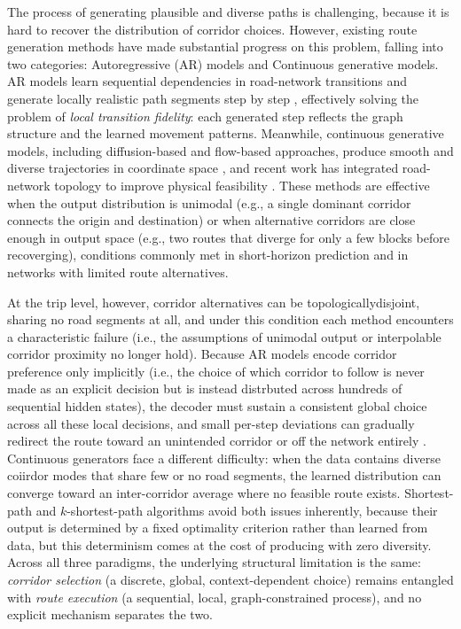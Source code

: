The process of generating plausible and diverse paths is challenging, because it is hard to recover the distribution of corridor choices. 
However, existing route generation methods have made substantial progress on this problem, falling into two categories: Autoregressive (AR) models and Continuous generative models.
AR models learn sequential dependencies in road-network transitions and generate locally realistic path segments step by step \citep{kong2023mobility_survey,hsu2024trajgpt,cao2025hoser}, effectively solving the problem of \emph{local transition fidelity}: each generated step reflects the graph structure and the learned movement patterns.
Meanwhile, continuous generative models, including diffusion-based and flow-based approaches, produce smooth and diverse trajectories in coordinate space \citep{zhu2023difftraj,wei2024diffrntraj,zhu2024controltraj,yang2025geo}, and recent work has integrated road-network topology to improve physical feasibility \citep{shi2024gdp,guo2025cardiff}.
These methods are effective when the output distribution is unimodal (e.g., a single dominant corridor connects the origin and destination) or when alternative corridors are close enough in output space (e.g., two routes that diverge for only a few blocks before recoverging), conditions commonly met in short-horizon prediction \citep{gupta2018social,salzmann2020trajectronpp,zhou2022hivt} and in networks with limited route alternatives.

At the trip level, however, corridor alternatives can be topologicallydisjoint, sharing no road segments at all, and under this condition each method encounters a characteristic failure
(i.e., the assumptions of unimodal output or interpolable corridor proximity no longer hold).
Because AR models encode corridor preference only implicitly (i.e., the choice of which corridor to follow is never made as an explicit decision but is instead distrbuted across hundreds of sequential hidden states), the decoder must sustain a consistent global choice across all these local decisions, and small per-step deviations can gradually redirect the route toward an unintended corridor or off the network entirely \citep{zhu2025survey}.
Continuous generators face a different difficulty: when the data contains diverse coiirdor modes that share few or no road segments, the learned distribution can converge toward an inter-corridor average where no feasible route exists.
Shortest-path and $k$-shortest-path algorithms avoid both issues inherently, because their output is determined by a fixed optimality criterion rather than learned from data, but this determinism comes at the cost of producing with zero diversity.
Across all three paradigms, the underlying structural limitation is the same: \emph{corridor selection} (a discrete, global, context-dependent choice) remains entangled with \emph{route execution} (a sequential, local, graph-constrained process), and no explicit mechanism separates the two.


